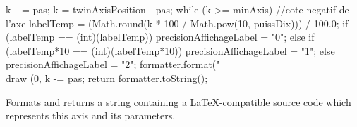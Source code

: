 \begin{code}
\begin{hide}
{{{{               k += pas;
            }
            k = twinAxisPosition - pas;
            while (k >= minAxis) { //cote negatif de l'axe
               labelTemp = (Math.round(k * 100 / Math.pow(10, puissDix))) / 100.0;
               if (labelTemp == (int)(labelTemp))
                  precisionAffichageLabel = "0";
               else if (labelTemp*10 == (int)(labelTemp*10))
                  precisionAffichageLabel = "1";
               else
                  precisionAffichageLabel = "2";
               formatter.format("\\draw (0,%
               k -= pas;
            }
         }
      }
      return formatter.toString();
   }\end{hide}
\end{code}
\begin{tabb}
   Formats and returns a string containing a \LaTeX-compatible
   source code which represents this axis and its parameters.
\end{tabb}
\begin{htmlonly}
\end{htmlonly}
